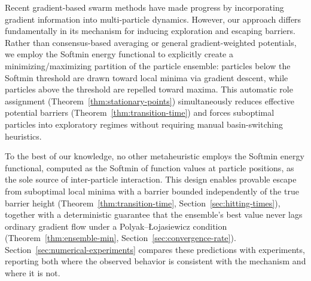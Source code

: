 \documentclass{article}
\theoremstyle{plain}
\theoremstyle{definition}
\theoremstyle{remark}
\begin{document}
Recent gradient-based swarm methods \cite{riedl2023gradient, bolte2024swarm, carrillo2021consensus, noel2012new} have made progress by incorporating gradient information into multi-particle dynamics. However, our approach differs fundamentally in its mechanism for inducing exploration and escaping barriers. Rather than consensus-based averaging or general gradient-weighted potentials, we employ the Softmin energy functional to explicitly create a minimizing/maximizing partition of the particle ensemble: particles below the Softmin threshold are drawn toward local minima via gradient descent, while particles above the threshold are repelled toward maxima. This automatic role assignment (Theorem~\ref{thm:stationary-points}) simultaneously reduces effective potential barriers (Theorem~\ref{thm:transition-time}) and forces suboptimal particles into exploratory regimes without requiring manual basin-switching heuristics.

To the best of our knowledge, no other metaheuristic employs the Softmin energy functional, computed as the Softmin of function values at particle positions, as the sole source of inter-particle interaction. This design enables provable escape from suboptimal local minima with a barrier bounded independently of the true barrier height (Theorem~\ref{thm:transition-time}, Section~\ref{sec:hitting-times}), together with a deterministic guarantee that the ensemble's best value never lags ordinary gradient flow under a Polyak--\L{}ojasiewicz condition (Theorem~\ref{thm:ensemble-min}, Section~\ref{sec:convergence-rate}). Section~\ref{sec:numerical-experiments} compares these predictions with experiments, reporting both where the observed behavior is consistent with the mechanism and where it is not.
\end{document}
